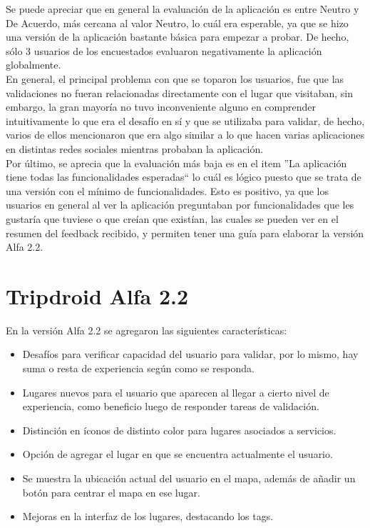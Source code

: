 \documentclass[10pt,letterpaper]{article}
\begin{document}
Se puede apreciar que en general la evaluación de la aplicación es entre Neutro y De Acuerdo, más cercana al valor Neutro, lo cuál era esperable, ya que se hizo una versión de la aplicación bastante básica para empezar a probar. De hecho, sólo 3 usuarios de los encuestados evaluaron negativamente la aplicación globalmente.\\

En general, el principal problema con que se toparon los usuarios, fue que las validaciones no fueran relacionadas directamente con el lugar que visitaban, sin embargo, la gran mayoría no tuvo inconveniente alguno en comprender intuitivamente lo que era el desafío en sí y que se utilizaba para validar, de hecho, varios de ellos mencionaron que era algo similar a lo que hacen varias aplicaciones en distintas redes sociales mientras probaban la aplicación.\\

Por último, se aprecia que la evaluación más baja es en el item ''La aplicación tiene todas las funcionalidades esperadas`` lo cuál es lógico puesto que se trata de una versión con el mínimo de funcionalidades. Esto es positivo, ya que los usuarios en general al ver la aplicación preguntaban por funcionalidades que les gustaría que tuviese o que creían que existían, las cuales se pueden ver en el resumen del feedback recibido, y permiten tener una guía para elaborar la versión Alfa 2.2.\\

\newpage
\section{Tripdroid Alfa 2.2}

En la versión Alfa 2.2 se agregaron las siguientes características:\\

\begin{itemize}
 \item Desafíos para verificar capacidad del usuario para validar, por lo mismo, hay suma o resta de experiencia según como se responda.
 \item Lugares nuevos para el usuario que aparecen al llegar a cierto nivel de experiencia, como beneficio luego de responder tareas de validación.
 \item Distinción en íconos de distinto color para lugares asociados a servicios.
 \item Opción de agregar el lugar en que se encuentra actualmente el usuario.
 \item Se muestra la ubicación actual del usuario en el mapa, además de añadir un botón para centrar el mapa en ese lugar.
 \item Mejoras en la interfaz de los lugares, destacando los tags.
\end{itemize}
\end{document}
